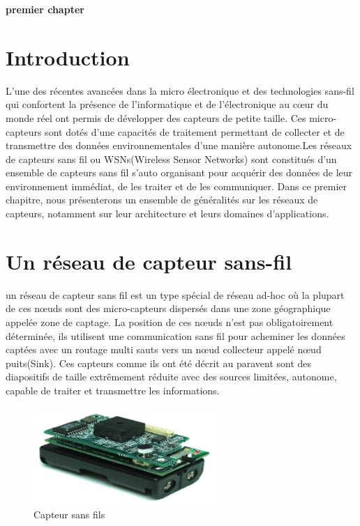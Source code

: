 

\cleardoublepage


\setcounter{chapter}{1}



\begin{center}
	\Huge\textbf{premier chapter}
\end{center}

\section{Introduction}
L’une des récentes avancées dans la micro électronique et des technologies sans-fil qui confortent la présence de l’informatique et de l’électronique au cœur du monde réel ont permis de développer des capteurs de petite taille. Ces  micro-capteurs sont dotés d’une capacités de traitement permettant de collecter et de transmettre des données environnementales d'une manière autonome.Les réseaux de capteurs sans fil ou WSNs(Wireless Sensor Networks) sont constitués d’un ensemble de capteurs sans fil s’auto organisant pour acquérir des données de leur environnement immédiat, de les traiter et de les communiquer.
Dans ce premier chapitre, nous présenterons un ensemble de généralités sur les réseaux de capteurs, notamment sur leur architecture et leurs domaines d’applications.\\

\section{Un réseau de capteur sans-fil}
un réseau de capteur sans fil est un type spécial de réseau ad-hoc où la plupart de ces nœuds sont des micro-capteurs dispersés dans une zone géographique appelée zone de captage. La position de ces nœuds n’est pas obligatoirement déterminée, ils utilisent une communication sans fil pour acheminer les données captées avec un routage multi sauts vers un nœud collecteur appelé nœud puits(Sink). Ces capteurs comme ils ont été décrit au paravent  sont des diapositifs de taille extrêmement réduite avec des sources limitées, autonome, capable de traiter et transmettre les informations.

\begin{figure}[h]
	\centering
	\includegraphics[width=7cm,height=3.7cm]{Chap1/1.png}
	\caption{Capteur sans fils}
	\label{fig:CSF}
\end{figure}

